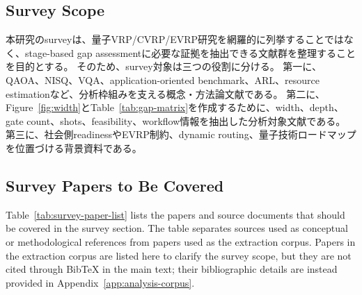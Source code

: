 \subsection{Survey Scope}

本研究のsurveyは、量子VRP/CVRP/EVRP研究を網羅的に列挙することではなく、stage-based gap assessmentに必要な証拠を抽出できる文献群を整理することを目的とする。
そのため、survey対象は三つの役割に分ける。
第一に、QAOA、NISQ、VQA、application-oriented benchmark、ARL、resource estimationなど、分析枠組みを支える概念・方法論文献である。
第二に、Figure~\ref{fig:width}とTable~\ref{tab:gap-matrix}を作成するために、width、depth、gate count、shots、feasibility、workflow情報を抽出した分析対象文献である。
第三に、社会側readinessやEVRP制約、dynamic routing、量子技術ロードマップを位置づける背景資料である。

\subsection{Survey Papers to Be Covered}

Table~\ref{tab:survey-paper-list} lists the papers and source documents that should be covered in the survey section.
The table separates sources used as conceptual or methodological references from papers used as the extraction corpus.
Papers in the extraction corpus are listed here to clarify the survey scope, but they are not cited through BibTeX in the main text; their bibliographic details are instead provided in Appendix~\ref{app:analysis-corpus}.

